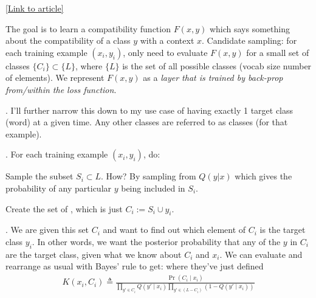 \documentclass[11pt]{article}
\begin{document}
{\scriptsize \href{https://www.tensorflow.org/extras/candidate_sampling.pdf}{[Link to article]}}

\myspace
{} The goal is to learn a compatibility function $F(x, y)$ which says something about the compatibility of a class $y$ with a context $x$. Candidate sampling: for each training example $(x_i, y_i)$, only need to evaluate $F(x, y)$ for a small set of classes $\{C_i\} \subset \{L\}$, where $\{L\}$ is the set of all possible classes (vocab size number of elements). We represent $F(x, y)$ as a \textit{layer that is trained by back-prop from/within the loss function}. 

\myspace
\p {}. I'll further narrow this down to my use case of having exactly 1 target class (word) at a given time. Any other classes are referred to as  classes (for that example). 

\myspace
\p {}. For each training example $(x_i, y_i)$, do:
\begin{compactitem}
	\item Sample the subset $S_i \subset L$. How? By sampling from $Q(y|x)$ which gives the probability of any particular $y$ being included in $S_i$. 
	
	\item Create the set of , which is just $C_i := S_i \cup y_i$. 
\end{compactitem}

\myspace
\p {}. We are given this set $C_i$ and want to find out which element of $C_i$ is the target class $y_i$. In other words, we want the posterior probability that any of the $y$ in $C_i$ are the target class, given what we know about $C_i$ and $x_i$. We can evaluate and rearrange as usual with Bayes' rule to get:
where they've just defined 
\begin{align}
K(x_i, C_i) \triangleq \frac{ \Pr\left(C_i \mid x_i \right) }{
	\prod_{y'\in C_i} Q(y' \mid x_i)
	\prod_{y'\in(L - C_i)} \left( 1 - Q(y' \mid x_i)\right)
}
\end{align}
\end{document}
